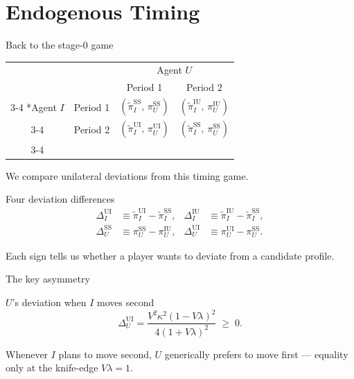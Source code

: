 \documentclass[10pt]{beamer}
\newcommand{\pt}{\widetilde{\pi}}
\newcommand{\rSS}{\mathrm{SS}}
\newcommand{\rUI}{\mathrm{UI}}
\newcommand{\rIU}{\mathrm{IU}}
\newcommand{\timinggametable}[4]{%
  \begin{table}[H]
    \setlength{\extrarowheight}{3pt}
    \centering
    \begin{tabular}{cc|c|c|}
      & \multicolumn{1}{c}{} & \multicolumn{2}{c}{Agent $U$}\\
      & \multicolumn{1}{c}{} & \multicolumn{1}{c}{Period 1} & \multicolumn{1}{c}{Period 2} \\\cline{3-4}
      \multirow{2}*{Agent $I$} & Period 1 & #1 & #2 \\\cline{3-4}
      & Period 2 & #3 & #4 \\\cline{3-4}
    \end{tabular}
  \end{table}%
}
\begin{document}
\section{Endogenous Timing}

\begin{frame}{Back to the stage-0 game}
  \timinggametable
    {$(\pt_I^{\rSS},\,\pi_U^{\rSS})$}
    {$(\pt_I^{\rIU},\,\pi_U^{\rIU})$}
    {$(\pt_I^{\rUI},\,\pi_U^{\rUI})$}
    {$(\pt_I^{\rSS},\,\pi_U^{\rSS})$}

  We compare unilateral deviations from this timing game.
\end{frame}

\begin{frame}{Four deviation differences}
  \begin{align*}
    \Delta_I^{\rUI} &\equiv \pt_I^{\rUI} - \pt_I^{\rSS}, &
    \Delta_I^{\rIU} &\equiv \pt_I^{\rIU} - \pt_I^{\rSS},\\[4pt]
    \Delta_U^{\rSS} &\equiv \pi_U^{\rSS} - \pi_U^{\rIU}, &
    \Delta_U^{\rUI} &\equiv \pi_U^{\rUI} - \pi_U^{\rSS}.
  \end{align*}

  Each sign tells us whether a player wants to deviate from a candidate
  profile.
\end{frame}

\begin{frame}{The key asymmetry}
  \begin{alertblock}{$U$'s deviation when $I$ moves second}
    \begin{equation*}
      \Delta_U^{\rUI}
      = \dfrac{V^2\kappa^2 (1-V\lambda)^2}{4(1+V\lambda)^2}
      \;\ge\; 0.
    \end{equation*}
  \end{alertblock}

  Whenever $I$ plans to move second, $U$ generically prefers to move
  first --- equality only at the knife-edge $V\lambda = 1$.
\end{frame}
\end{document}
